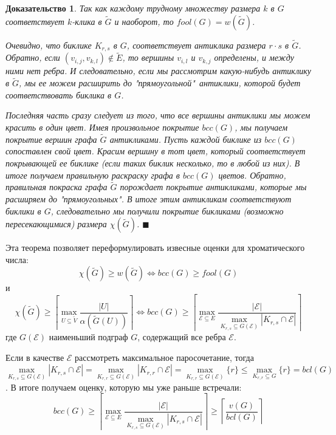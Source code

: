 \documentclass[a4paper]{article}
\newtheorem*{msolution}{Доказательство}
\begin{document}
\begin{msolution}
    Так как каждому трудному множеству размера $k$ в $G$ соответствует $k$-клика в $\widetilde{G}$ и 
    наоборот, то $fool(G) = w(\widetilde{G})$.
    
    Очевидно, что биклике $K_{r,s}$ в $G$, соответствует антиклика размера $r\cdot s$ в $\widetilde{G}$. 
    Обратно, если $(v_{i,j}, v_{k,l}) \notin \widetilde{E}$, то вершины $v_{i, l}$ и $v_{k, j}$ 
    определены, и между ними нет ребра. И следовательно, если мы рассмотрим какую-нибудь антиклику в 
    $\widetilde{G}$, мы ее можем расширить до "прямоугольной"\  антиклики, которой будет соответствовать 
    биклика в $G$.
    
    Последняя часть сразу следует из того, что все вершины антиклики мы можем красить в один цвет. Имея 
    произвольное покрытие $bcc(G)$, мы получаем покрытие вершин графа $\widetilde{G}$ антикликами. 
    Пусть каждой биклике из $bcc(G)$ сопоставлен свой цвет. Красим вершину в тот цвет, который соответствует 
    покрывающей ее биклике (если таких биклик несколько, то в любой из них). В итоге получаем правильную 
    раскраску графа в $bcc(G)$ цветов. Обратно, правильная покраска графа $\widetilde{G}$ порождает 
    покрытие антикликами, которые мы расширяем до "прямоугольных". В итоге этим антикликам 
    соответствуют биклики в $G$, следовательно мы получили покрытие бикликами (возможно пересекающимися) 
    размера $\chi(\widetilde{G})$. $\blacksquare$
\end{msolution}

Эта теорема позволяет переформулировать извесные оценки для хроматического числа:
$$ \chi(\widetilde{G}) \geq w(\widetilde{G}) \Longleftrightarrow bcc(G) \geq fool(G)$$
и $$\chi(\widetilde{G}) \geq \left\lceil\max\limits_{U\subseteq \widetilde{V}}\frac{|U|}{\alpha(\widetilde{G}(U))}\right\rceil 
\Longleftrightarrow bcc(G) \geq \left\lceil\max\limits_{\mathcal{E}\subseteq E}\frac{|\mathcal{E}|}
{\max\limits_{K_{r,s}\subseteq G(\mathcal{E})}|K_{r,s}\cap\mathcal{E}|}\right\rceil$$ где $G(\mathcal{E})$ наименьший подграф $G$, 
содержащий все ребра $\mathcal{E}$. 

Если в качестве $\mathcal{E}$ рассмотреть максимальное паросочетание, тогда $\max\limits_{K_{r,s}\subseteq 
G(\mathcal{E})}|K_{r,s}\cap\mathcal{E}| = \max\limits_{K_{r,r}\subseteq G(\mathcal{E})}|K_{r,r}\cap\mathcal{E}| = 
\max\limits_{K_{r,r}\subseteq G(\mathcal{E})}\{r\} \leq \max\limits_{K_{r,r}\subseteq G}\{r\} = bcl(G)$. В итоге 
получаем оценку, которую мы уже раньше встречали: $$bcc(G) \geq \left\lceil\max\limits_{\mathcal{E}\subseteq E}\frac{|\mathcal{E}|}
{\max\limits_{K_{r,s}\subseteq G(\mathcal{E})}|K_{r,s}\cap\mathcal{E}|}\right\rceil  \geq \left\lceil\frac{v(G)}{bcl(G)}\right\rceil$$
\end{document}
